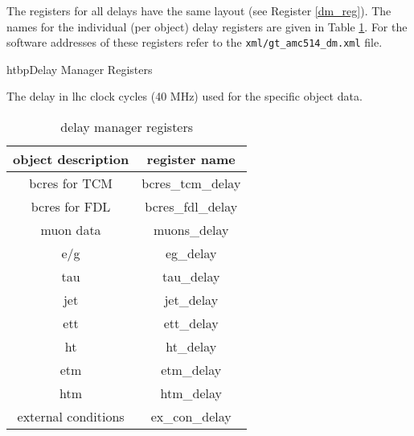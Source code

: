 The registers for all delays have the same layout (see Register \ref{dm_reg}). The names for the individual (per object) delay registers are given in Table \ref{tab_dm_regs}.
For the software addresses of these registers refer to the \texttt{xml/gt\_amc514\_dm.xml} file.

\begin{register}{htbp}{Delay Manager Registers}{}%
	\label{dm_reg}
	\begin{regdesc}
	\begin{reglist}
		\item [delay] The delay in lhc clock cycles (40 MHz) used for the specific object data.
	\end{reglist}
	\end{regdesc}
\end{register}

\begin{table}[h]
\vspace{5mm}
\begin{center}
\begin{tabular}{|c|c|}
\hline
object description & register name \\ \hline  \hline
bcres for TCM & bcres\_tcm\_delay \\ \hline
bcres for FDL & bcres\_fdl\_delay  \\ \hline
muon data & muons\_delay  \\ \hline
e/g & eg\_delay  \\ \hline
tau & tau\_delay \\ \hline
jet & jet\_delay  \\ \hline
ett & ett\_delay  \\ \hline
ht & ht\_delay  \\ \hline
etm & etm\_delay  \\ \hline
htm & htm\_delay  \\ \hline
external conditions & ex\_con\_delay  \\ \hline
\end{tabular}
\end{center}
\caption{delay manager registers}
\label{tab_dm_regs}
\end{table}

% 
%
%
%

